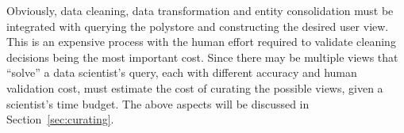 

Obviously, data cleaning, data transformation and entity consolidation must be integrated with querying the polystore and constructing the desired user view.  
This is an expensive process with the human effort required to validate cleaning decisions being the most important cost. 
Since there may be multiple views that ``solve'' a data scientist's query, each with different accuracy and human validation cost, \dcv must estimate the cost of curating the possible views,
given a scientist's time budget. 
The above aspects will be discussed in Section~\ref{sec:curating}.








